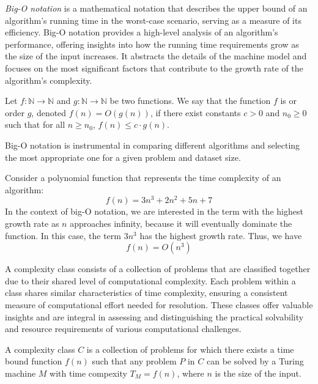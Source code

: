 \emph{Big-O notation} is a mathematical notation that describes the upper bound of an algorithm's running time in the worst-case scenario, serving as a measure of its efficiency. Big-O notation provides a high-level analysis of an algorithm's performance, offering insights into how the running time requirements grow as the size of the input increases. It abstracts the details of the machine model and focuses on the most significant factors that contribute to the growth rate of the algorithm's complexity.

\begin{definition}
Let $f:\mathbb{N} \to \mathbb{N}$ and $g:\mathbb{N} \to \mathbb{N}$ be two functions. We say that the function $f$ is or order $g$, denoted \(f(n) = O(g(n))\), if there exist constants \(c > 0\) and \(n_0 \geq 0\) such that for all \(n \geq n_0\), \(f(n) \leq c \cdot g(n)\).
\end{definition}

Big-O notation is instrumental in comparing different algorithms and selecting the most appropriate one for a given problem and dataset size.

\begin{example}
Consider a polynomial function that represents the time complexity of an algorithm:
\[
f(n) = 3n^3 + 2n^2 + 5n + 7
\]
In the context of big-O notation, we are interested in the term with the highest growth rate as \(n\) approaches infinity, because it will eventually dominate the function. In this case, the term \(3n^3\) has the highest growth rate. Thus, we have
\[
f(n) = O(n^3)
\]
\end{example}

A complexity class consists of a collection of problems that are classified together due to their shared level of computational complexity. Each problem within a class shares similar characteristics of time complexity, ensuring a consistent measure of computational effort needed for resolution. These classes offer valuable insights and are integral in assessing and distinguishing the practical solvability and resource requirements of various computational challenges.

\begin{definition}
A complexity class $C$ is a collection of problems for which there exists a time bound function $f(n)$ such that any problem $P$ in $C$ can be solved by a Turing machine $M$ with time compexity $T_M = f(n)$, where $n$ is the size of the input.
\end{definition}

